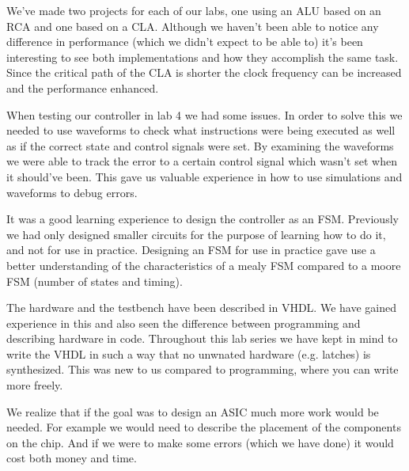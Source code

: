 \documentclass[a4paper,11pt]{article}
\begin{document}
We've made two projects for each of our labs, one using an ALU based on an RCA and one based on a CLA. Although we haven't been able to notice any difference in performance (which we didn't expect to be able to) it's been interesting to see both implementations and how they accomplish the same task. Since the critical path of the CLA is shorter the clock frequency can be increased and the performance enhanced.
 
When testing our controller in lab 4 we had some issues. In order to solve this we needed to use waveforms to check what instructions were being executed as well as if the correct state and control signals were set. By examining the waveforms we were able to track the error to a certain control signal which wasn't set when it should've been. This gave us valuable experience in how to use simulations and waveforms to debug errors.

It was a good learning experience to design the controller as an FSM. Previously we had only designed smaller circuits for the purpose of learning how to do it, and not for use in practice. Designing an FSM for use in practice gave use a better understanding of the characteristics of a mealy FSM compared to a moore FSM (number of states and timing).

The hardware and the testbench have been described in VHDL. We have gained experience in this and also seen the difference between programming and describing hardware in code. Throughout this lab series we have kept in mind to write the VHDL in such a way that no unwnated  hardware (e.g. latches) is synthesized. This was new to us compared to programming, where you can write more freely.

We realize that if the goal was to design an ASIC much more work would be needed. For example we would need to describe the placement of the components on the chip. And if we were to make some errors (which we have done) it would cost both money and time.
\end{document}
